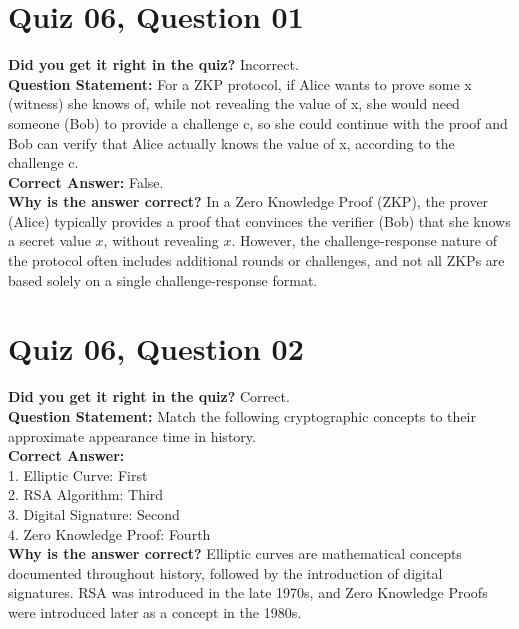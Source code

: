 \documentclass{article}
\begin{document}
\vspace{5em}

\section*{Quiz 06, Question 01}
\textbf{Did you get it right in the quiz?} Incorrect. \\
\textbf{Question Statement:} For a ZKP protocol, if Alice wants to prove some x (witness) she knows of, while not revealing the value of x, she would need someone (Bob) to provide a challenge c, so she could continue with the proof and Bob can verify that Alice actually knows the value of x, according to the challenge c. \\
\textbf{Correct Answer:} False. \\
\textbf{Why is the answer correct?} In a Zero Knowledge Proof (ZKP), the prover (Alice) typically provides a proof that convinces the verifier (Bob) that she knows a secret value \( x \), without revealing \( x \). However, the challenge-response nature of the protocol often includes additional rounds or challenges, and not all ZKPs are based solely on a single challenge-response format.

\vspace{1em}

\section*{Quiz 06, Question 02}
\textbf{Did you get it right in the quiz?} Correct. \\
\textbf{Question Statement:} Match the following cryptographic concepts to their approximate appearance time in history. \\
\textbf{Correct Answer:} \\
1. Elliptic Curve: First \\
2. RSA Algorithm: Third \\
3. Digital Signature: Second \\
4. Zero Knowledge Proof: Fourth \\
\textbf{Why is the answer correct?} Elliptic curves are mathematical concepts documented throughout history, followed by the introduction of digital signatures. RSA was introduced in the late 1970s, and Zero Knowledge Proofs were introduced later as a concept in the 1980s.

\vspace{1em}

\end{document}

